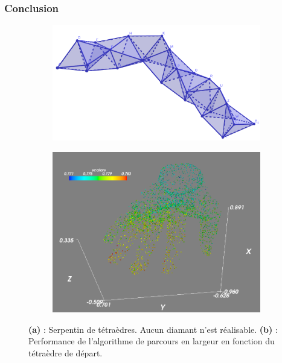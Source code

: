 \documentclass[9pt]{beamer}
\begin{document}
\begin{frame}
\small
\frametitle{Conclusion}
\vspace{-6.5pt}
\begin{figure}[H]
\centering
\begin{subfigure}{.5\textwidth}
  \centering
  \includegraphics[scale=0.12]{Images/serpentin}
  \caption{}
\end{subfigure}%
\begin{subfigure}{.5\textwidth}
  \centering
  \includegraphics[scale=0.11]{Images/bfs_starting}
  \caption{}
\end{subfigure}
\vspace{-5.5pt}
\caption{\textbf{(a)} : Serpentin de tétraèdres. Aucun diamant n'est réalisable. \textbf{(b)} : Performance de l’algorithme de parcours en largeur en fonction du tétraèdre de départ.}
\end{figure}
\vspace{-6.5pt}

\end{frame}
\end{document}
